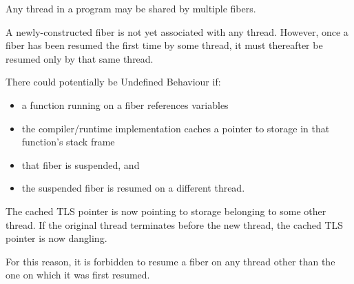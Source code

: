 \label{xthread}

Any thread in a program may be shared by multiple fibers.

A newly-constructed fiber is not yet associated with any thread. However,
once a fiber has been resumed the first time by some thread, it must
thereafter be resumed only by that same thread.

There could potentially be Undefined Behaviour if:
\begin{itemize}
    \item a function running on a fiber references  variables
    \item the compiler/runtime implementation caches a pointer
          to  storage in that function's stack frame
    \item that fiber is suspended, and
    \item the suspended fiber is resumed on a different thread.
\end{itemize}

The cached TLS pointer is now pointing to storage belonging to some other
thread. If the original thread terminates before the new thread, the cached
TLS pointer is now dangling.

For this reason, it is forbidden to resume a fiber on any thread other than
the one on which it was first resumed.
